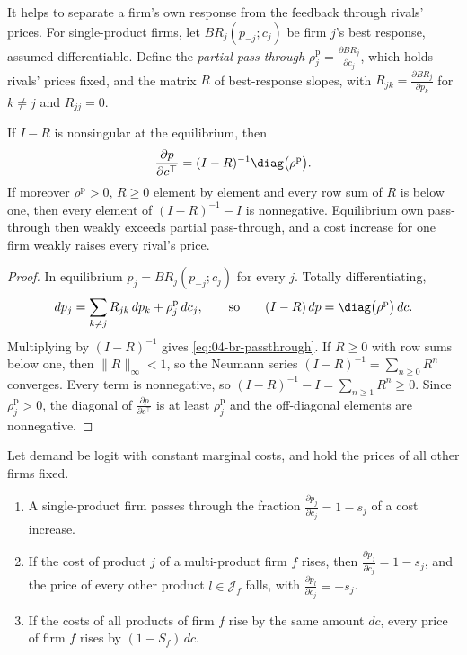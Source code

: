 It helps to separate a firm's own response from the feedback through rivals' prices. For single-product firms,
let $BR_j(p_{-j}; c_j)$ be firm $j$'s best response, assumed differentiable. Define the \emph{partial pass-through}
$\rho^{\mathrm{p}}_j = \frac{\partial BR_j}{\partial c_j}$, which holds rivals' prices fixed, and the matrix $R$ of
best-response slopes, with $R_{jk} = \frac{\partial BR_j}{\partial p_k}$ for $k \neq j$ and $R_{jj} = 0$.

\begin{lemma}\label{lem:04-br-passthrough}
If $I - R$ is nonsingular at the equilibrium, then
\begin{equation}\label{eq:04-br-passthrough}
\frac{\partial p}{\partial c^\top} = (I - R)^{-1}\diag\big(\rho^{\mathrm{p}}\big).
\end{equation}
If moreover $\rho^{\mathrm{p}} > 0$, $R \geq 0$ element by element and every row sum of $R$ is below one, then
every element of $(I - R)^{-1} - I$ is nonnegative. Equilibrium own pass-through then weakly exceeds partial pass-through,
and a cost increase for one firm weakly raises every rival's price.
\end{lemma}

\begin{proof}
In equilibrium $p_j = BR_j(p_{-j}; c_j)$ for every $j$. Totally differentiating,
\begin{equation*}
dp_j = \sum_{k \neq j}R_{jk}\,dp_k + \rho^{\mathrm{p}}_j\,dc_j ,
\qquad\text{so}\qquad
(I - R)\,dp = \diag\big(\rho^{\mathrm{p}}\big)\,dc .
\end{equation*}
Multiplying by $(I - R)^{-1}$ gives \eqref{eq:04-br-passthrough}. If $R \geq 0$ with row sums below one, then
$\|R\|_\infty < 1$, so the Neumann series $(I - R)^{-1} = \sum_{n \geq 0}R^n$ converges. Every term is
nonnegative, so $(I - R)^{-1} - I = \sum_{n \geq 1}R^n \geq 0$. Since $\rho^{\mathrm{p}}_j > 0$, the diagonal of
$\frac{\partial p}{\partial c^\top}$ is at least $\rho^{\mathrm{p}}_j$ and the off-diagonal elements are nonnegative.
\end{proof}

\begin{proposition}\label{prop:04-passthrough}
Let demand be logit with constant marginal costs, and hold the prices of all other firms fixed.
\begin{enumerate}[label=(\roman*)]
  \item A single-product firm passes through the fraction $\frac{\partial p_j}{\partial c_j} = 1 - s_j$ of a cost
  increase.
  \item If the cost of product $j$ of a multi-product firm $f$ rises, then $\frac{\partial p_j}{\partial c_j} = 1 -
  s_j$, and the price of every other product $l \in \mathcal{J}_f$ falls, with $\frac{\partial p_l}{\partial c_j}
  = -s_j$.
  \item If the costs of all products of firm $f$ rise by the same amount $dc$, every price of firm $f$ rises by
  $(1 - S_f)\,dc$.
\end{enumerate}
\end{proposition}

